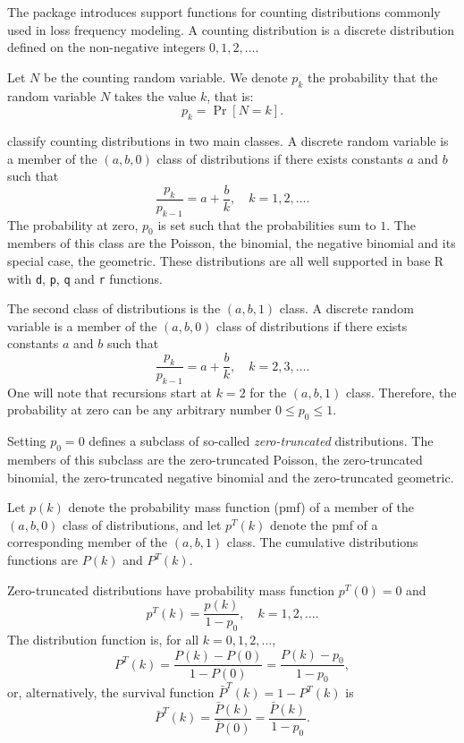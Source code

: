 \documentclass[x11names]{article}
\newcommand{\proglang}[1]{\textsf{#1}}
\newcommand{\code}[1]{\texttt{#1}}
\begin{document}
The package introduces support functions for counting distributions
commonly used in loss frequency modeling. A counting distribution is a
discrete distribution defined on the non-negative integers
$0, 1, 2, \dots$.

Let $N$ be the counting random variable. We denote $p_k$ the
probability that the random variable $N$ takes the value $k$, that is:
\begin{equation*}
  p_k = \Pr[N = k].
\end{equation*}

\citet{LossModels4e} classify counting distributions in two main
classes. A discrete random variable is a member of the $(a, b, 0)$
class of distributions if there exists constants $a$ and $b$ such that
\begin{equation*}
  \frac{p_k}{p_{k - 1}} = a + \frac{b}{k}, \quad k = 1, 2, \dots.
\end{equation*}
The probability at zero, $p_0$ is set such that the probabilities sum
to $1$. The members of this class are the Poisson, the binomial, the
negative binomial and its special case, the geometric. These
distributions are all well supported in base \proglang{R} with
\code{d}, \code{p}, \code{q} and \code{r} functions.

The second class of distributions is the $(a, b, 1)$ class. A discrete
random variable is a member of the $(a, b, 0)$ class of distributions
if there exists constants $a$ and $b$ such that
\begin{equation*}
  \frac{p_k}{p_{k - 1}} = a + \frac{b}{k}, \quad k = 2, 3, \dots.
\end{equation*}
One will note that recursions start at $k = 2$ for the $(a, b, 1)$
class. Therefore, the probability at zero can be any arbitrary number
$0 \leq p_0 \leq 1$.

Setting $p_0 = 0$ defines a subclass of so-called
\emph{zero-truncated} distributions. The members of this subclass are
the zero-truncated Poisson, the zero-truncated binomial, the
zero-truncated negative binomial and the zero-truncated geometric.

Let $p(k)$ denote the probability mass function (pmf) of a member of
the $(a, b, 0)$ class of distributions, and let $p^T(k)$ denote the
pmf of a corresponding member of the $(a, b, 1)$ class. The cumulative
distributions functions are $P(k)$ and $P^T(k)$.

Zero-truncated distributions have probability mass function
$p^T(0) = 0$ and
\begin{equation*}
  p^T(k) = \frac{p(k)}{1 - p_0}, \quad k = 1, 2, \dots.
\end{equation*}
The distribution function is, for all $k = 0, 1, 2, \dots$,
\begin{equation*}
  P^T(k)
  = \frac{P(k) - P(0)}{1 - P(0)}
  = \frac{P(k) - p_0}{1 - p_0},
\end{equation*}
or, alternatively, the survival function $\bar{P}^T(k) = 1 - P^T(k)$
is
\begin{equation*}
  \bar{P}^T(k)
  = \frac{\bar{P}(k)}{\bar{P}(0)}
  = \frac{\bar{P}(k)}{1 - p_0}.
\end{equation*}
\end{document}
